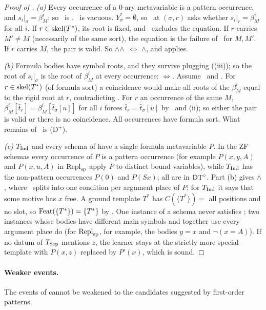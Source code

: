 \begin{proof}[Proof of ]
\emph{(a)}
Every occurrence of a $0$-ary metavariable is a pattern occurrence, and $s_i|_\sigma=\beta^i_M$; so \evRs\ is \evR. \evN\ is vacuous. $Y^*_\sigma=\emptyset$, so \evU\ at $(\sigma,r)$ asks whether $s_i|_r=\beta^i_M$ for all $i$. If $r\in\mathrm{skel}(T^*)$, its root is fixed, and \evR\ excludes the equation. If $r$ carries $M'\neq M$ (necessarily of the same sort), the equation is the failure of \evD\ for $M,M'$. If $r$ carries $M$, the pair is valid. So \evRs$\wedge$\evN$\wedge$\evU\ $\Leftrightarrow$ \evR$\wedge$\evD, and  applies.

\emph{(b)} Formula bodies have symbol roots, and they survive plugging ((iii)); so the root of $s_i|_\sigma$ is the root of $\beta^i_M$ at every occurrence: \evRs$\Leftrightarrow$\evR. Assume \evR\ and \evN. For $r\in\mathrm{skel}(T^*)$ (of formula sort) a coincidence would make all roots of the $\beta^i_M$ equal to the rigid root at $r$, contradicting \evR. For $r$ an occurrence of the same $M$, $\beta^i_M[\bar t_r]=\beta^i_M[\bar t_\sigma[\bar u]]$ for all $i$ forces $\bar t_r=\bar t_\sigma[\bar u]$ by \evN\ and (ii); so either the pair is valid or there is no coincidence. All occurrences have formula sort. What remains of \evU\ is (D$^+$).

\emph{(c)} $T_{\mathrm{Ind}}$ and every schema of  have a single formula metavariable $P$. In the ZF schemas every occurrence of $P$ is a pattern occurrence (for example $P(x,y,A)$ and $P(x,u,A)$ in $\mathrm{Repl}_{\mathrm{sp}}$ apply $P$ to distinct bound variables), while $T_{\mathrm{Ind}}$ has the non-pattern occurrences $P(0)$ and $P(Sx)$; all are in $\mathrm{DT}^{\circ}$. Part (b) gives \evR$\wedge$\evN, where \evN\ splits into one condition per argument place of $P$; for $T_{\mathrm{Ind}}$ it says that some motive has $x$ free. A ground template $T^*$ has $C(\{T^*\})=$ all positions and no slot, so $\mathrm{Feat}(\{T^*\})=\{T^*\}$ by . One instance of a schema never satisfies \evR; two instances whose bodies have different main symbols and together use every argument place do (for $\mathrm{Repl}_{\mathrm{sp}}$, for example, the bodies $y=x$ and $\neg(x=A)$). If no datum of $T_{\mathrm{Sep}}$ mentions $z$, the learner stays at the strictly more special template with $P(x,z)$ replaced by $P'(x)$, which is sound.
\end{proof}

\paragraph{Weaker events.} The events of  cannot be weakened to the candidates suggested by first-order patterns.

